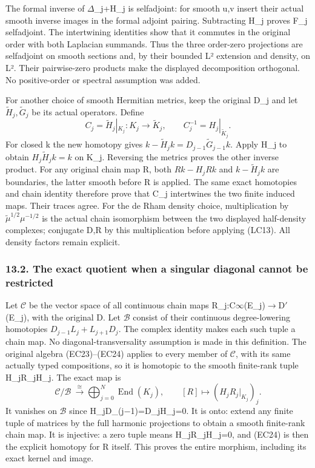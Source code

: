 \documentclass[
  11pt,
]{article}
\begin{document}
The formal inverse of \ensuremath{\Delta}\_j+H\_j is selfadjoint: for smooth u,v insert
their actual smooth inverse images in the formal adjoint pairing.
Subtracting H\_j proves F\_j selfadjoint. The intertwining identities
show that it commutes in the original order with both Laplacian
summands. Thus the three order-zero projections are selfadjoint on
smooth sections and, by their bounded L² extension and density, on L².
Their pairwise-zero products make the displayed decomposition
orthogonal. No positive-order or spectral assumption was added.

For another choice of smooth Hermitian metrics, keep the original D\_j
and let \(\widetilde H_j,\widetilde G_j\) be its actual operators.
Define \[
C_j=\widetilde H_j|_{K_j}:K_j\longrightarrow\widetilde K_j,
\qquad C_j^{-1}=H_j|_{\widetilde K_j}.
\tag{LC13}
\] For closed k the new homotopy gives
\(k-\widetilde H_jk=D_{j-1}\widetilde G_{j-1}k\). Apply H\_j to obtain
\(H_j\widetilde H_jk=k\) on K\_j. Reversing the metrics proves the other
inverse product. For any original chain map R, both \(Rk-H_jRk\) and
\(k-\widetilde H_jk\) are boundaries, the latter smooth before R is
applied. The same exact homotopies and chain identity therefore prove
that C\_j intertwines the two finite induced maps. Their traces agree.
For the de Rham density choice, multiplication by
\(\widetilde\mu^{1/2}\mu^{-1/2}\) is the actual chain isomorphism
between the two displayed half-density complexes; conjugate D,R by this
multiplication before applying (LC13). All density factors remain
explicit.

\subsubsection{13.2. The exact quotient when a singular diagonal cannot
be
restricted}\label{the-exact-quotient-when-a-singular-diagonal-cannot-be-restricted}

Let \(\mathscr C\) be the vector space of all continuous chain maps
R\_j:C\ensuremath{\infty}(E\_j)\ensuremath{\to}D\ensuremath{\prime}(E\_j), with the original D. Let \(\mathscr B\) consist
of their continuous degree-lowering homotopies
\(D_{j-1}L_j+L_{j+1}D_j\). The complex identity makes each such tuple a
chain map. No diagonal-transversality assumption is made in this
definition. The original algebra (EC23)--(EC24) applies to every member
of \(\mathscr C\), with its same actually typed compositions, so it is
homotopic to the smooth finite-rank tuple H\_jR\_jH\_j. The exact map is
\[
\mathscr C/\mathscr B\ \xrightarrow{\ \cong\ }
       \bigoplus_{j=0}^N\operatorname{End}(K_j),
\qquad [R]\longmapsto(H_jR_j|_{K_j})_j.
\tag{LC14}
\] It vanishes on \(\mathscr B\) since H\_jD\_(j−1)=D\_jH\_j=0. It is
onto: extend any finite tuple of matrices by the full harmonic
projections to obtain a smooth finite-rank chain map. It is injective: a
zero tuple means H\_jR\_jH\_j=0, and (EC24) is then the explicit
homotopy for R itself. This proves the entire morphism, including its
exact kernel and image.
\end{document}
